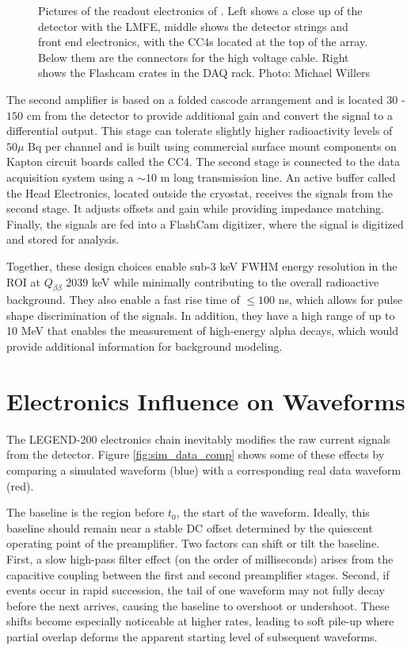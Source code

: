 \begin{figure}[!htb]
    \caption{Pictures of the readout electronics of {\Ltwo}. Left shows a close up of the detector with the LMFE, middle shows the detector strings and front end electronics, with the CC4s located at the top of the array. Below them are the connectors for the high voltage cable. Right shows the Flashcam crates in the DAQ rack. Photo: Michael Willers}
   \label{ch6_fig_l200_elec_model_real}
\end{figure}


The second amplifier is based on a folded cascode arrangement and is located $30$ -$150$ cm from the detector to provide additional gain and convert the signal to a differential output. This stage can tolerate slightly higher radioactivity levels of $50\mu$ Bq per channel and is built using commercial surface mount components on Kapton circuit boards called the CC4. The second stage is connected to the data acquisition system using a $\sim 10$ m long transmission line. An active buffer called the Head Electronics, located outside the cryostat, receives the signals from the second stage. It adjusts offsets and gain while providing impedance matching. Finally, the signals are fed into a FlashCam digitizer, where the signal is digitized and stored for analysis.

Together, these design choices enable sub-$3$ keV FWHM energy resolution in the ROI at $Q_{\beta\beta}$ 2039 keV while minimally contributing to the overall radioactive background. They also enable a fast rise time of $\leq 100$ ns, which allows for pulse shape discrimination of the signals. In addition, they have a high range of up to 10 MeV that enables the measurement of high-energy alpha decays, which would provide additional information for background modeling.

\section{Electronics Influence on Waveforms}
The LEGEND-200 electronics chain inevitably modifies the raw current signals from the detector. Figure \ref{fig:sim_data_comp} shows some of these effects by comparing a simulated waveform (blue) with a corresponding real data waveform (red).

The baseline is the region before $t_0$, the start of the waveform. Ideally, this baseline should remain near a stable DC offset determined by the quiescent operating point of the preamplifier. Two factors can shift or tilt the baseline. First, a slow high-pass filter effect (on the order of milliseconds) arises from the capacitive coupling between the first and second preamplifier stages. Second, if events occur in rapid succession, the tail of one waveform may not fully decay before the next arrives, causing the baseline to overshoot or undershoot. These shifts become especially noticeable at higher rates, leading to soft pile-up where partial overlap deforms the apparent starting level of subsequent waveforms. 

